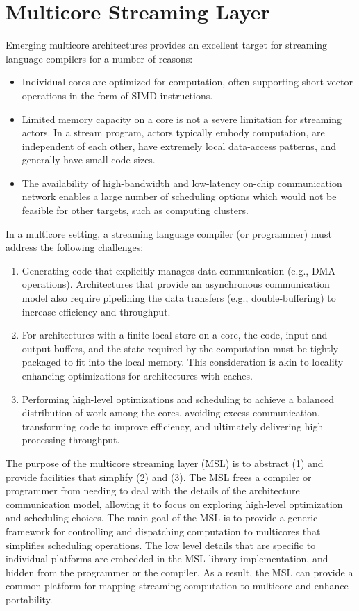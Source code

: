 \section{Multicore Streaming Layer}\label{ch:lib}

Emerging multicore architectures provides an excellent target for
streaming language compilers for a number of reasons:
\begin{itemize}
\item Individual cores are optimized for computation, often supporting
short vector operations in the form of SIMD instructions.
\item Limited memory capacity on a core is not a severe
limitation for streaming actors. In a stream program, actors typically
embody computation, are independent of each other, have extremely
local data-access patterns, and generally have small code sizes.
\item The availability of high-bandwidth and low-latency on-chip
communication network enables a large number of scheduling options
which would not be feasible for other targets, such as computing
clusters.
\end{itemize}

In a multicore setting, a streaming language compiler (or programmer)
must address the following challenges:
\begin{enumerate}
\item Generating code that explicitly manages data communication
  (e.g., DMA operations). Architectures that provide an asynchronous
  communication model also require pipelining the data transfers (e.g.,
  double-buffering) to increase efficiency and throughput.
\item For architectures with a finite local store on a core, the code,
  input and output buffers, and the state required by the computation
  must be tightly packaged to fit into the local memory. This
  consideration is akin to locality enhancing optimizations for
  architectures with caches.
\item Performing high-level optimizations and scheduling to achieve a
  balanced distribution of work among the cores, avoiding excess
  communication, transforming code to improve efficiency, and
  ultimately delivering high processing throughput.
\end{enumerate}

The purpose of the multicore streaming layer (MSL) is to abstract
\textsf{(1)} and provide facilities that simplify \textsf{(2)} and
\textsf{(3)}. The MSL frees a compiler or programmer from needing to
deal with the details of the architecture communication model,
allowing it to focus on exploring high-level optimization and
scheduling choices. The main goal of the MSL is to provide a generic
framework for controlling and dispatching computation to multicores
that simplifies scheduling operations. The low level details that are
specific to individual platforms are embedded in the MSL library
implementation, and hidden from the programmer or the compiler. As a
result, the MSL can provide a common platform for mapping streaming
computation to multicore and enhance portability.
